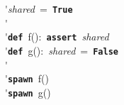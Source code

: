 \'\>\textit{shared}~=~\texttt{\textbf{True}}\\

\'\>\\

\'\>\texttt{\textbf{def}}~f():~\texttt{\textbf{assert}}~\textit{shared}\\

\'\>\texttt{\textbf{def}}~g():~\textit{shared}~=~\texttt{\textbf{False}}\\

\'\>\\

\'\>\texttt{\textbf{spawn}}~f()\\

\'\>\texttt{\textbf{spawn}}~g()